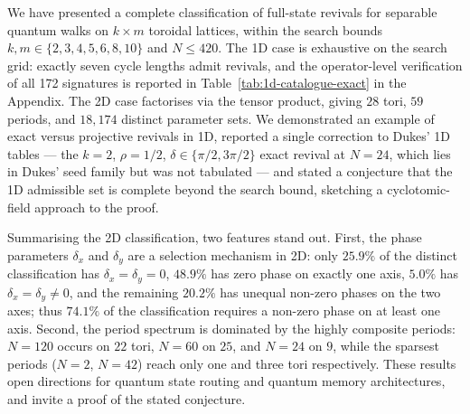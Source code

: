 We have presented a complete classification of full-state
revivals for separable quantum walks on $k \times m$
toroidal lattices, within the search bounds $k, m \in
\{2, 3, 4, 5, 6, 8, 10\}$ and $N \le 420$. The 1D case is
exhaustive on the search grid: exactly seven cycle lengths
admit revivals, and the operator-level verification of all
172 signatures is reported in Table~\ref{tab:1d-catalogue-exact}
in the Appendix.  The 2D case
factorises via the tensor product, giving $28$ tori, $59$
periods, and $18{,}174$ distinct parameter sets. We demonstrated
an example of exact versus projective revivals in 1D, reported
a single correction to Dukes' 1D tables --- the $k = 2$,
$\rho = 1/2$, $\delta \in \{\pi/2, 3\pi/2\}$ exact revival at
$N = 24$, which lies in Dukes' seed family but was not
tabulated --- and stated a conjecture that the 1D admissible set
is complete beyond the search bound, sketching a
cyclotomic-field approach to the proof.

Summarising the 2D classification, two features stand out.
First, the phase parameters $\delta_x$ and $\delta_y$ are a
selection mechanism in 2D: only $25.9\%$ of the distinct
classification has $\delta_x = \delta_y = 0$, $48.9\%$ has
zero phase on exactly one axis, $5.0\%$ has
$\delta_x = \delta_y \neq 0$, and the remaining $20.2\%$ has
unequal non-zero phases on the two axes; thus $74.1\%$ of the
classification requires a non-zero phase on at least one axis.
Second, the period
spectrum is dominated by the highly composite periods: $N = 120$
occurs on $22$ tori, $N = 60$ on $25$, and $N = 24$ on $9$,
while the sparsest periods ($N = 2$, $N = 42$) reach only one
and three tori respectively. These results open directions for
quantum state routing and quantum memory architectures, and
invite a proof of the stated conjecture.
